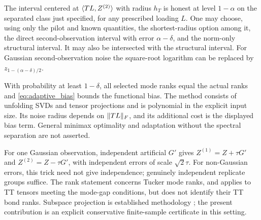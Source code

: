 \begin{theorem}\label{thm:adaptive_tangent}
The interval centered at $\langle TL,Z^{(2)}\rangle$ with radius $h_T$ is honest at level $1-\alpha$ on the separated class just specified, for any prescribed loading $L$. One may choose, using only the pilot and known quantities, the shortest-radius option among it, the direct second-observation interval with error $\alpha-\delta$, and the norm-only structural interval. It may also be intersected with the structural interval. For Gaussian second-observation noise the square-root logarithm can be replaced by $z_{1-(\alpha-\delta)/2}$.

With probability at least $1-\delta$, all selected mode ranks equal the actual ranks and \eqref{eq:adaptive_bias} bounds the functional bias. The method consists of unfolding SVDs and tensor projections and is polynomial in the explicit input size. Its noise radius depends on $\lVert TL\rVert_F$, and its additional cost is the displayed bias term. General minimax optimality and adaptation without the spectral separation are not asserted.
\end{theorem}

For one Gaussian observation, independent artificial $G'$ gives
$Z^{(1)}=Z+\tau G'$ and $Z^{(2)}=Z-\tau G'$, with independent errors of scale $\sqrt2\tau$. For non-Gaussian errors, this trick need not give independence; genuinely independent replicate groups suffice. The rank statement concerns Tucker mode ranks, and applies to TT tensors meeting the mode-gap conditions, but does not identify their TT bond ranks. Subspace projection is established methodology \citep{xu2025}; the present contribution is an explicit conservative finite-sample certificate in this setting.
